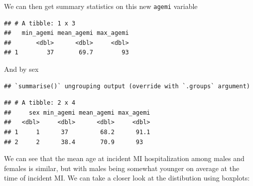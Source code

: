 \documentclass[
]{book}
\newenvironment{Shaded}{\begin{snugshade}}{\end{snugshade}}
\newcommand{\CommentTok}[1]{\textcolor[rgb]{0.56,0.35,0.01}{\textit{#1}}}
\newcommand{\DataTypeTok}[1]{\textcolor[rgb]{0.13,0.29,0.53}{#1}}
\newcommand{\KeywordTok}[1]{\textcolor[rgb]{0.13,0.29,0.53}{\textbf{#1}}}
\newcommand{\NormalTok}[1]{#1}
\newcommand{\OperatorTok}[1]{\textcolor[rgb]{0.81,0.36,0.00}{\textbf{#1}}}
\newcommand{\StringTok}[1]{\textcolor[rgb]{0.31,0.60,0.02}{#1}}
\begin{document}
We can then get summary statistics on this new \texttt{agemi} variable

\begin{Shaded}
\end{Shaded}

\begin{verbatim}
## # A tibble: 1 x 3
##   min_agemi mean_agemi max_agemi
##       <dbl>      <dbl>     <dbl>
## 1        37       69.7        93
\end{verbatim}

And by sex

\begin{Shaded}
\end{Shaded}

\begin{verbatim}
## `summarise()` ungrouping output (override with `.groups` argument)
\end{verbatim}

\begin{verbatim}
## # A tibble: 2 x 4
##     sex min_agemi mean_agemi max_agemi
##   <dbl>     <dbl>      <dbl>     <dbl>
## 1     1      37         68.2      91.1
## 2     2      38.4       70.9      93
\end{verbatim}

We can see that the mean age at incident MI hospitalization among males and females is similar, but with males being somewhat younger on average at the time of incident MI. We can take a closer look at the distibution using boxplots:

\begin{Shaded}
\end{Shaded}
\end{document}
